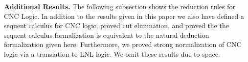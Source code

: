 \textbf{Additional Results.} The following subsection shows the
reduction rules for CNC Logic. In addition to the results given in this
paper we also have defined a sequent calculus for CNC logic, proved
cut elimination, and proved the the sequent calculus formalization is
equivalent to the natural deduction formalization given here.
Furthermore, we proved strong normalization of CNC logic via a
translation to LNL logic.  We omit these results due to space.




